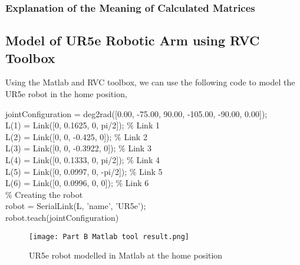 \subsubsection{Explanation of the Meaning of Calculated Matrices}



\subsection{Model of UR5e Robotic Arm using RVC Toolbox}
Using the Matlab and RVC toolbox, we can use the following code to model the UR5e robot in the home position,

\begin{algorithm}[H]
    jointConfiguration = deg2rad([0.00, -75.00, 90.00, -105.00, -90.00, 0.00]);\\
    L(1) = Link([0, 0.1625, 0,  pi/2]); \% Link 1\\
    L(2) = Link([0, 0, -0.425,  0]); \% Link 2\\
    L(3) = Link([0,  0, -0.3922, 0]); \% Link 3\\
    L(4) = Link([0, 0.1333, 0,  pi/2]); \% Link 4\\
    L(5) = Link([0, 0.0997, 0,  -pi/2]); \% Link 5\\
    L(6) = Link([0, 0.0996, 0,  0]); \% Link 6\\
    \% Creating the robot\\
    robot = SerialLink(L, 'name', 'UR5e');\\
    robot.teach(jointConfiguration)
\end{algorithm}
\begin{figure}[H]
    \centering
    \texttt{[image: Part B Matlab tool result.png]}
    \caption{UR5e robot modelled in Matlab at the home position}
    \label{fig:UR5e robot modelled in Matlab}
\end{figure}
